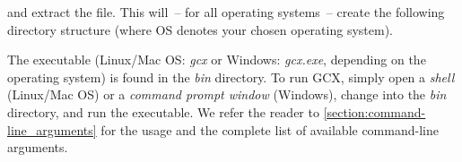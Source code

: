 \noindent and extract the file. This will~-- for all operating systems~-- create the following directory structure (where OS denotes your chosen operating system). \\

\label{dirtree_(installation):using_the_binaries}

\noindent The executable (Linux/Mac OS: \emph{gcx} or Windows: \emph{gcx.exe}, depending on the operating system) is found in the \emph{bin} directory. To run GCX, simply open a \emph{shell} (Linux/Mac OS) or a \emph{command prompt window} (Windows), change into the \emph{bin} directory, and run the executable. We refer the reader to \autoref{section:command-line_arguments} for the usage and the complete list of available command-line arguments.

